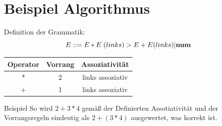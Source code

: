 \documentclass[t]{beamer}
\renewcommand{\Coloneqq}{\mathrel{\mathop{::}}=}
\begin{document}
	\section{Beispiel Algorithmus}\label{sec:beispiel-algorithmus}
	\begin{frame}
		\centering
		\begin{block}{Definition der Grammatik:}
			\centering
			\[E \Coloneqq E * E \phantom{|} (links) > E + E (links) | \bold{num} \]
			\bigskip
			\begin{tabular}{|c|c|c|}
				\hline
				Operator & Vorrang & Assoziativität   \\
				\hline
				*            & 2       & links assoziativ \\
				\hline
				+            & 1       & links assoziativ \\
				\hline
			\end{tabular}\label{tab:table4}
		\end{block}
		\bigskip\bigskip
		\begin{exampleblock}{Beispiel}
			So wird $2 + 3 * 4$ gemäß der Definierten Assotiativität und der Vorrangsregeln eindeutig als
			$2 + (3 * 4)$ ausgewertet, was korrekt ist.
		\end{exampleblock}
	\end{frame}
\end{document}
